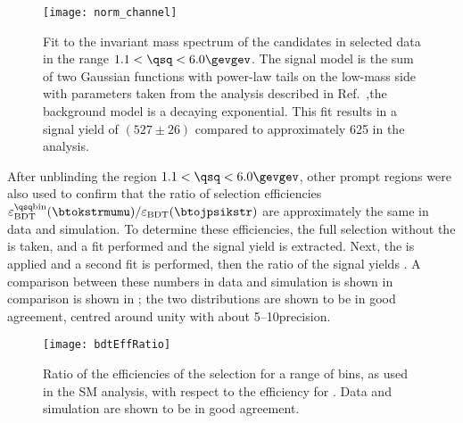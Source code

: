 \begin{figure}
  \begin{center}
    \texttt{[image: norm\_channel]}
    \caption[Fit to the normalisation channel, \btokstrmumu for $1.1<\qsq<6.0\gevgev$]
    {
      Fit to the invariant mass spectrum of the \Bd candidates in selected data in the range
      $1.1<\qsq<6.0\gevgev$.
      The signal model is the sum of two Gaussian functions with power-law tails on the low-mass
      side with parameters taken from the analysis described in
      Ref.~\protect\cite{LHCb-CONF-2015-002},the background model is a decaying exponential.
      This fit results in a signal yield of $(527\pm26)$ compared to approximately 625 in the \sm
      analysis.
    }
    \label{fig:db:norm}
  \end{center}
\end{figure}

After unblinding the region $1.1<\qsq<6.0\gevgev$, other prompt \qsq regions were also used to
confirm that the ratio of \bdt selection efficiencies
$\varepsilon_\mathrm{BDT}^\mathrm{\qsq bin}(\btokstrmumu) / \varepsilon_\mathrm{BDT}(\btojpsikstr)$
are approximately the same in data and simulation.
To determine these efficiencies, the full selection without the \BDT is taken, and a fit performed
and the signal yield is extracted.
Next, the \BDT is applied and a second fit is performed, then  the ratio of the signal
yields .
A comparison between these numbers in data and simulation is shown in comparison is shown in
; the two distributions are shown to be in good agreement, centred around
unity with about 5--10\pc precision.

\begin{figure}
  \begin{center}
    \texttt{[image: bdtEffRatio]}
    \caption[Efficiency ratios]
    {
      Ratio of the efficiencies of the \bdt selection for a range of \qsq bins, as used in the SM
      \btokstrmumu analysis, with respect to the efficiency for \decay{\Bd}{\jpsi\Kstarz}.
      Data and simulation are shown to be in good agreement.
    }
    \label{fig:bdtEffRatio}
  \end{center}
\end{figure}

